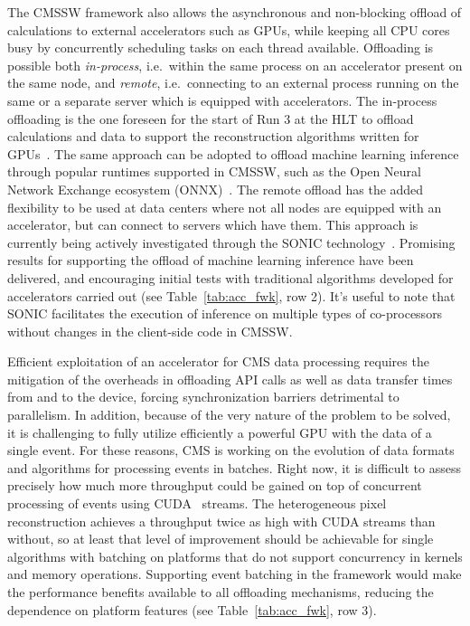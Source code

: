 \documentclass{cmspaper}
\begin{document}
The CMSSW framework also allows the asynchronous and non-blocking offload of calculations to external accelerators such as GPUs, while keeping all CPU cores busy by concurrently scheduling tasks on each thread available. Offloading is possible both \textit{in-process}, i.e.~within the same process on an accelerator present on the same node, and \textit{remote}, i.e.~connecting to an external process running on the same or a separate server which is equipped with accelerators. 
The in-process offloading is the one foreseen for the start of Run 3 at the HLT to offload calculations and data to support the reconstruction algorithms written for GPUs~\cite{CMS-TDR-21-007}. The same approach can be adopted to offload machine learning inference through popular runtimes supported in CMSSW, such as the Open Neural Network Exchange ecosystem (ONNX)~\cite{onnx}. 
The remote offload has the added flexibility to be used at data centers where not all nodes are equipped with an accelerator, but can connect to servers which have them. This approach is currently being actively investigated through the SONIC technology~\cite{Duarte:2695229,Krupa_2021}. Promising results for supporting the offload of machine learning inference have been delivered, and encouraging initial tests with traditional algorithms developed for accelerators carried out (see Table~\ref{tab:acc_fwk}, row 2). It's useful to note that SONIC facilitates the execution of inference on multiple types of co-processors without changes in the client-side code in CMSSW.

Efficient exploitation of an accelerator for CMS data processing requires the mitigation of the overheads in offloading API calls as well as data transfer times from and to the device, forcing synchronization barriers detrimental to parallelism. In addition, because of the very nature of the problem to be solved, it is challenging to fully utilize efficiently a powerful GPU with the data of a single event. For these reasons, CMS is working on the evolution of data formats and algorithms for processing events in batches. 
Right now, it is difficult to assess precisely how much more throughput could be gained on top of concurrent processing of events using CUDA~\cite{10.1145/1365490.1365500} streams. The heterogeneous pixel reconstruction achieves a throughput twice as high with CUDA streams than without, so at least that level of improvement should be achievable for single algorithms with batching on platforms that do not support concurrency in kernels and memory operations. Supporting event batching in the framework would make the performance benefits available to all offloading mechanisms, reducing the dependence on platform features (see Table~\ref{tab:acc_fwk}, row 3).
\end{document}
